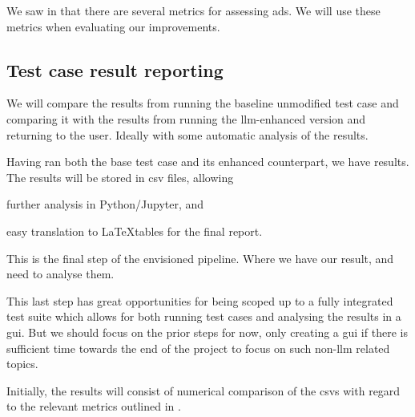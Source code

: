 We saw in  that there are several metrics for assessing
\acrshort{ads}. We will use these metrics when evaluating our improvements.

\subsection{Test case result reporting}

We will compare the results from running
the baseline unmodified test case and comparing it with the results from
running the \acrshort{llm}-enhanced version and returning to the user. Ideally with
some automatic analysis of the results.

Having ran both the base test case and its enhanced counterpart, we have
results. The results will be stored in \acrfull{csv} files, allowing \begin{inparaenum}
    \item further analysis in Python/Jupyter,
    and
    \item easy translation to \LaTeX tables for the final report.
\end{inparaenum}

This is the final step of the envisioned pipeline. Where we have our result, and
need to analyse them.

This last step has great opportunities for being scoped up to a fully integrated
test suite which allows for both running test cases and analysing the results in
a \acrfull{gui}. But we should focus on the prior steps for now, only creating a
\acrshort{gui} if there is sufficient time towards the end of the project to
focus on such non-\acrshort{llm} related topics.

Initially, the results will consist of numerical comparison of the
\acrshort{csv}s with regard to the relevant metrics outlined in
.
